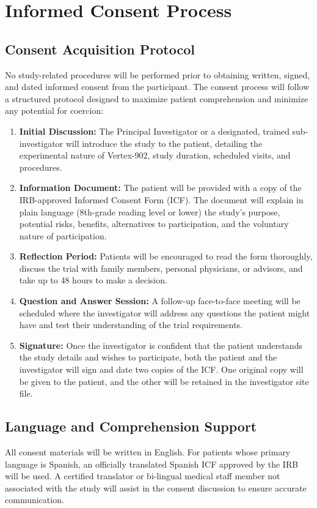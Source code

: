 \section{Informed Consent Process}

\subsection{Consent Acquisition Protocol}
No study-related procedures will be performed prior to obtaining written, signed, and dated informed consent from the participant. The consent process will follow a structured protocol designed to maximize patient comprehension and minimize any potential for coercion:
\begin{enumerate}
    \item \textbf{Initial Discussion:} The Principal Investigator or a designated, trained sub-investigator will introduce the study to the patient, detailing the experimental nature of Vertex-902, study duration, scheduled visits, and procedures.
    \item \textbf{Information Document:} The patient will be provided with a copy of the IRB-approved Informed Consent Form (ICF). The document will explain in plain language (8th-grade reading level or lower) the study's purpose, potential risks, benefits, alternatives to participation, and the voluntary nature of participation.
    \item \textbf{Reflection Period:} Patients will be encouraged to read the form thoroughly, discuss the trial with family members, personal physicians, or advisors, and take up to 48 hours to make a decision.
    \item \textbf{Question and Answer Session:} A follow-up face-to-face meeting will be scheduled where the investigator will address any questions the patient might have and test their understanding of the trial requirements.
    \item \textbf{Signature:} Once the investigator is confident that the patient understands the study details and wishes to participate, both the patient and the investigator will sign and date two copies of the ICF. One original copy will be given to the patient, and the other will be retained in the investigator site file.
\end{enumerate}

\subsection{Language and Comprehension Support}
All consent materials will be written in English. For patients whose primary language is Spanish, an officially translated Spanish ICF approved by the IRB will be used. A certified translator or bi-lingual medical staff member not associated with the study will assist in the consent discussion to ensure accurate communication.

